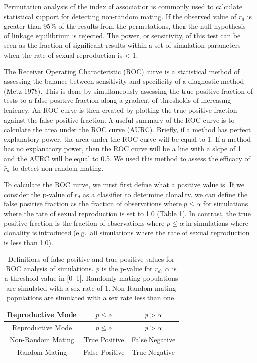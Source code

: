 \documentclass[]{article}
\theoremstyle{definition}
\theoremstyle{definition}
\theoremstyle{definition}
\theoremstyle{remark}
\begin{document}
Permutation analysis of the index of association is commonly used to
calculate statistical support for detecting non-random mating. If the
observed value of \(\bar{r}_d\) is greater than 95\% of the results from
the permutations, then the null hypothesis of linkage equilibrium is
rejected. The power, or sensitivity, of this test can be seen as the
fraction of significant results within a set of simulation parameters
when the rate of sexual reproduction is \textless{} 1.

The Receiver Operating Characteristic (ROC) curve is a statistical
method of assessing the balance between sensitivity and specificity of a
diagnostic method (Metz 1978). This is done by simultaneously assessing
the true positive fraction of tests to a false positive fraction along a
gradient of thresholds of increasing leniency. An ROC curve is then
created by plotting the true positive fraction against the false
positive fraction. A useful summary of the ROC curve is to calculate the
area under the ROC curve (AURC). Briefly, if a method has perfect
explanatory power, the area under the ROC curve will be equal to 1. If a
method has no explanatory power, then the ROC curve will be a line with
a slope of 1 and the AURC will be equal to 0.5. We used this method to
assess the efficacy of \(\bar{r}_d\) to detect non-random mating.

To calculate the ROC curve, we must first define what a positive value
is. If we consider the p-value of \(\bar{r}_d\) as a classifier to
determine clonality, we can define the false positive fraction as the
fraction of observations where \(p \leq \alpha\) for simulations where
the rate of sexual reproduction is set to 1.0 (Table
\ref{tab:ROC-schema}). In contrast, the true positive fraction is the
fraction of observations where \(p \leq \alpha\) in simulations where
clonality is introduced (e.g.~all simulations where the rate of sexual
reproduction is less than 1.0).

\begin{longtable}[]{@{}ccc@{}}
\caption{\label{tab:ROC-schema} Definitions of false positive and true
positive values for ROC analysis of simulations. \emph{p} is the p-value
for \(\bar{r}_d\), \(\alpha\) is a threshold value in {[}0, 1{]}.
Randomly mating populations are simulated with a sex rate of 1.
Non-Random mating populations are simulated with a sex rate less than
one.}\tabularnewline
\toprule
Reproductive Mode & \(p \leq \alpha\) & \(p > \alpha\)\tabularnewline
\midrule
\endfirsthead
\toprule
Reproductive Mode & \(p \leq \alpha\) & \(p > \alpha\)\tabularnewline
\midrule
\endhead
Non-Random Mating & True Positive & False Negative\tabularnewline
Random Mating & False Positive & True Negative\tabularnewline
\bottomrule
\end{longtable}
\end{document}
